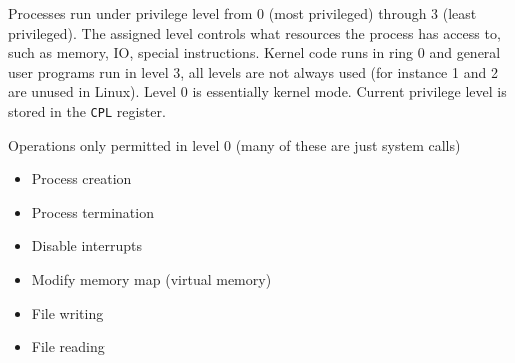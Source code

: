 Processes run under privilege level from 0 (most privileged) through 3 (least privileged). The assigned level controls what resources the process has access to, such as memory, IO, special instructions. Kernel code runs in ring 0 and general user programs run in level 3, all levels are not always used (for instance 1 and 2 are unused in Linux). Level 0 is essentially kernel mode. Current privilege level is stored in the \texttt{CPL} register.

Operations only permitted in level 0 (many of these are just system calls)
\begin{itemize}
\item Process creation
\item Process termination
\item Disable interrupts
\item Modify memory map (virtual memory)
\item File writing
\item File reading
\end{itemize}

